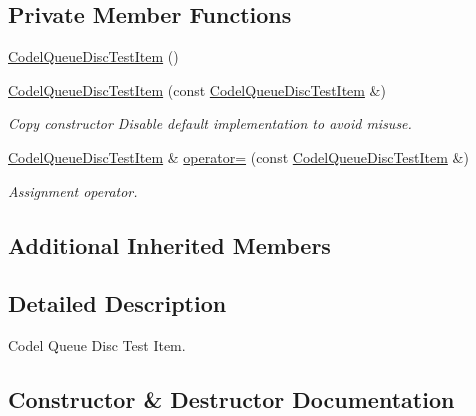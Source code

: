 \subsection*{Private Member Functions}
\begin{DoxyCompactItemize}
\item 
\hyperlink{classCodelQueueDiscTestItem_a15f6f2dd95c7657ec94599024c9adac3}{Codel\+Queue\+Disc\+Test\+Item} ()
\item 
\hyperlink{classCodelQueueDiscTestItem_a7de97cddf7ff1357d163dceedc1e0c27}{Codel\+Queue\+Disc\+Test\+Item} (const \hyperlink{classCodelQueueDiscTestItem}{Codel\+Queue\+Disc\+Test\+Item} \&)
\begin{DoxyCompactList}\small\item\em Copy constructor Disable default implementation to avoid misuse. \end{DoxyCompactList}\item 
\hyperlink{classCodelQueueDiscTestItem}{Codel\+Queue\+Disc\+Test\+Item} \& \hyperlink{classCodelQueueDiscTestItem_a1e99d88cd773ce777b47b5cf6cf12d47}{operator=} (const \hyperlink{classCodelQueueDiscTestItem}{Codel\+Queue\+Disc\+Test\+Item} \&)
\begin{DoxyCompactList}\small\item\em Assignment operator. \end{DoxyCompactList}\end{DoxyCompactItemize}
\subsection*{Additional Inherited Members}


\subsection{Detailed Description}
Codel Queue Disc Test Item. 

\subsection{Constructor \& Destructor Documentation}
